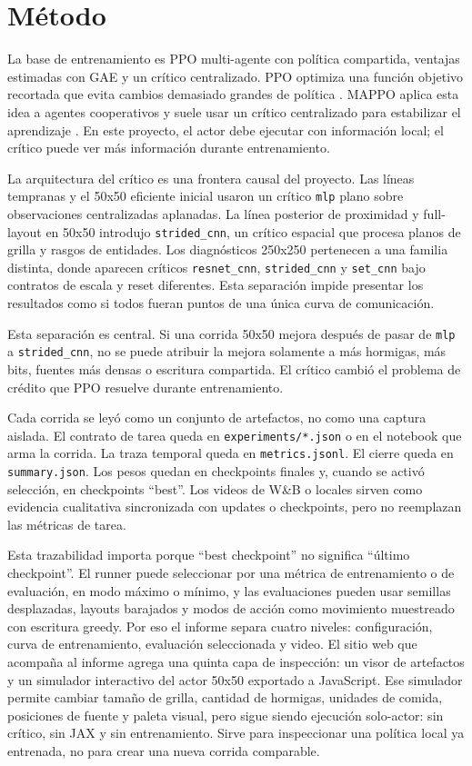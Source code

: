 \documentclass[11pt,a4paper]{article}
\newcommand{\run}[1]{\nolinkurl{#1}}
\begin{document}
\section{Método}

La base de entrenamiento es PPO multi-agente con política compartida, ventajas estimadas con GAE y un crítico centralizado. PPO optimiza una función objetivo recortada que evita cambios demasiado grandes de política \cite{schulman2017ppo}. MAPPO aplica esta idea a agentes cooperativos y suele usar un crítico centralizado para estabilizar el aprendizaje \cite{yu2022mappo}. En este proyecto, el actor debe ejecutar con información local; el crítico puede ver más información durante entrenamiento.

La arquitectura del crítico es una frontera causal del proyecto. Las líneas tempranas y el 50x50 eficiente inicial usaron un crítico \run{mlp} plano sobre observaciones centralizadas aplanadas. La línea posterior de proximidad y full-layout en 50x50 introdujo \run{strided_cnn}, un crítico espacial que procesa planos de grilla y rasgos de entidades. Los diagnósticos 250x250 pertenecen a una familia distinta, donde aparecen críticos \run{resnet_cnn}, \run{strided_cnn} y \run{set_cnn} bajo contratos de escala y reset diferentes. Esta separación impide presentar los resultados como si todos fueran puntos de una única curva de comunicación.

Esta separación es central. Si una corrida 50x50 mejora después de pasar de \run{mlp} a \run{strided_cnn}, no se puede atribuir la mejora solamente a más hormigas, más bits, fuentes más densas o escritura compartida. El crítico cambió el problema de crédito que PPO resuelve durante entrenamiento.

Cada corrida se leyó como un conjunto de artefactos, no como una captura aislada. El contrato de tarea queda en \run{experiments/*.json} o en el notebook que arma la corrida. La traza temporal queda en \run{metrics.jsonl}. El cierre queda en \run{summary.json}. Los pesos quedan en checkpoints finales y, cuando se activó selección, en checkpoints ``best''. Los videos de W\&B o locales sirven como evidencia cualitativa sincronizada con updates o checkpoints, pero no reemplazan las métricas de tarea.

Esta trazabilidad importa porque ``best checkpoint'' no significa ``último checkpoint''. El runner puede seleccionar por una métrica de entrenamiento o de evaluación, en modo máximo o mínimo, y las evaluaciones pueden usar semillas desplazadas, layouts barajados y modos de acción como movimiento muestreado con escritura greedy. Por eso el informe separa cuatro niveles: configuración, curva de entrenamiento, evaluación seleccionada y video. El sitio web que acompaña al informe agrega una quinta capa de inspección: un visor de artefactos y un simulador interactivo del actor 50x50 exportado a JavaScript. Ese simulador permite cambiar tamaño de grilla, cantidad de hormigas, unidades de comida, posiciones de fuente y paleta visual, pero sigue siendo ejecución solo-actor: sin crítico, sin JAX y sin entrenamiento. Sirve para inspeccionar una política local ya entrenada, no para crear una nueva corrida comparable.
\end{document}
